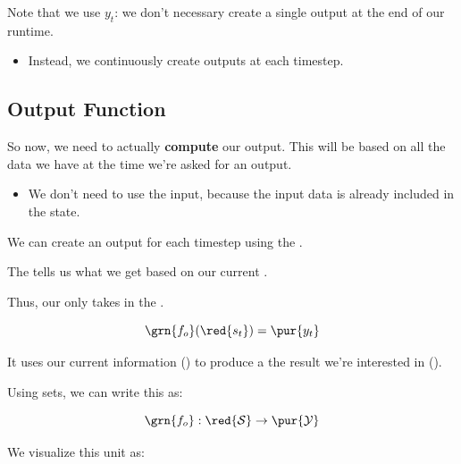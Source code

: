         Note that we use $y_t$: we don't necessary create a single output at the end of our runtime.
        
        \begin{itemize}
            \item Instead, we continuously create outputs at each timestep.
        \end{itemize}

    \subsection{Output Function}
        
        So now, we need to actually \textbf{compute} our output. This will be based on all the data we have  at the time we're asked for an output.

        \begin{itemize}
            \item We don't need to use the input, because the input data is already included in the state.
        \end{itemize}

        We can create an output for each timestep using the .\\

        \begin{definition}
            The   tells us what  we get based on our current .
            
            Thus, our  only takes in the . 
            
            \begin{equation*}
                \grn{f_o}(\red{s_t}) = \pur{y_t}
            \end{equation*}
            
            It uses our current information () to produce a the result we're interested in ().
            
            Using sets, we can write this as:
            
            \begin{equation*}
                \grn{f_o}: \red{\mathcal{S}} \rightarrow \pur{\mathcal{Y}}
            \end{equation*}
        \end{definition}
        
        We visualize this unit as:
        
